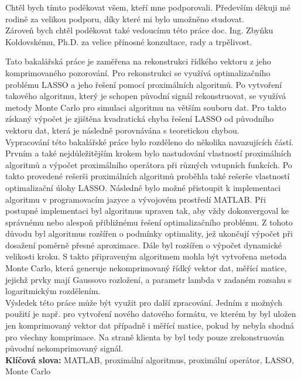 \documentclass[FM,BP]{tulthesis}
\begin{document}
\begin{acknowledgement}
Chtěl bych tímto poděkovat všem, kteří mne podporovali. Především děkuji mé rodině za velikou podporu, díky které mi bylo umožněno studovat. 
\\
Zároveň bych chtěl poděkovat také vedoucímu této práce doc. Ing. Zbyňku Koldovskému, Ph.D. za velice přínosné konzultace, rady a trpělivost.
\end{acknowledgement}
\clearpage
\begin{abstractCZ}

\setlength\parindent{20pt} Tato bakalářská práce je zaměřena na rekonstrukci řídkého vektoru z jeho komprimovaného pozorování. Pro rekonstrukci se využívá optimalizačního problému LASSO a jeho řešení pomocí proximálních algoritmů. Po vytvoření takového algoritmu, který je schopen původní signál rekonstruovat, se využívá metody Monte Carlo pro simulaci algoritmu na větším souboru dat. Pro takto získaný výpočet je zjištěna kvadratická chyba řešení LASSO od původního vektoru dat, která je následně porovnávána s teoretickou chybou.  
\\

\setlength\parindent{20pt} Vypracování této bakalářské práce bylo rozděleno do několika navazujících částí. Prvním a také nejdůležitějším krokem bylo nastudování vlastností proximálních algoritmů a výpočet proximálního operátora při různých vstupních funkcích. Po takto provedené rešerši proximálních algoritmů proběhla také rešerše vlastností optimalizační úlohy LASSO. Následně bylo možné přistoupit k implementaci algoritmu v programovacím jazyce a vývojovém prostředí MATLAB. Při postupné implementaci byl algoritmus upraven tak, aby vždy dokonvergoval ke správnému nebo alespoň přibližnému řešení optimalizačního problému. Z tohoto důvodu byl algoritmus rozšířen o podmínky optimality, jež ukončují výpočet při dosažení poměrně přesné aproximace. Dále byl rozšířen o výpočet dynamické velikosti kroku. S takto připraveným algoritmem mohla být vytvořena metoda Monte Carlo, která generuje nekomprimovaný řídký vektor dat, měřící matice, jejichž prvky mají Gaussovo rozložení, a parametr lambda v zadaném rozsahu s logaritmickým rozdělením.  
\\

\setlength\parindent{20pt} Výsledek této práce může být využit pro další zpracování. Jedním z možných použití je např. pro vytvoření nového datového formátu, ve kterém by byl uložen jen komprimovaný vektor dat případně i měřící matice, pokud by nebyla shodná pro všechny komprimace. Na straně klienta by byl tedy pouze zrekonstruován původní nekomprimovaný signál.
\\

\textbf{Klíčová slova:} MATLAB, proximální algoritmus, proximální operátor, LASSO, Monte Carlo
\end{abstractCZ}
\end{document}

